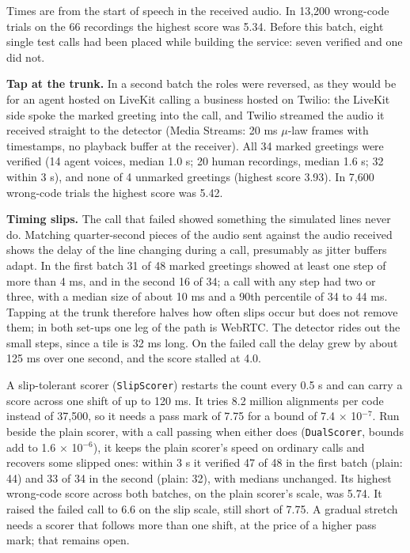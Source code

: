 \documentclass[10pt,a4paper]{article}
\begin{document}
Times are from the start of speech in the received audio. In 13,200 wrong-code trials on the 66 recordings the highest score was 5.34. Before this batch, eight single test calls had been placed while building the service: seven verified and one did not.

\textbf{Tap at the trunk.} In a second batch the roles were reversed, as they would be for an agent hosted on LiveKit calling a business hosted on Twilio: the LiveKit side spoke the marked greeting into the call, and Twilio streamed the audio it received straight to the detector (Media Streams: 20 ms $\mu$-law frames with timestamps, no playback buffer at the receiver). All 34 marked greetings were verified (14 agent voices, median 1.0 s; 20 human recordings, median 1.6 s; 32 within 3 s), and none of 4 unmarked greetings (highest score 3.93). In 7,600 wrong-code trials the highest score was 5.42.

\textbf{Timing slips.} The call that failed showed something the simulated lines never do. Matching quarter-second pieces of the audio sent against the audio received shows the delay of the line changing during a call, presumably as jitter buffers adapt. In the first batch 31 of 48 marked greetings showed at least one step of more than 4 ms, and in the second 16 of 34; a call with any step had two or three, with a median size of about 10 ms and a 90th percentile of 34 to 44 ms. Tapping at the trunk therefore halves how often slips occur but does not remove them; in both set-ups one leg of the path is WebRTC. The detector rides out the small steps, since a tile is 32 ms long. On the failed call the delay grew by about 125 ms over one second, and the score stalled at 4.0.

A slip-tolerant scorer (\texttt{SlipScorer}) restarts the count every 0.5 s and can carry a score across one shift of up to 120 ms. It tries 8.2 million alignments per code instead of 37,500, so it needs a pass mark of 7.75 for a bound of 7.4 $\times$ 10$^{-7}$. Run beside the plain scorer, with a call passing when either does (\texttt{DualScorer}, bounds add to 1.6 $\times$ 10$^{-6}$), it keeps the plain scorer's speed on ordinary calls and recovers some slipped ones: within 3 s it verified 47 of 48 in the first batch (plain: 44) and 33 of 34 in the second (plain: 32), with medians unchanged. Its highest wrong-code score across both batches, on the plain scorer's scale, was 5.74. It raised the failed call to 6.6 on the slip scale, still short of 7.75. A gradual stretch needs a scorer that follows more than one shift, at the price of a higher pass mark; that remains open.
\end{document}
